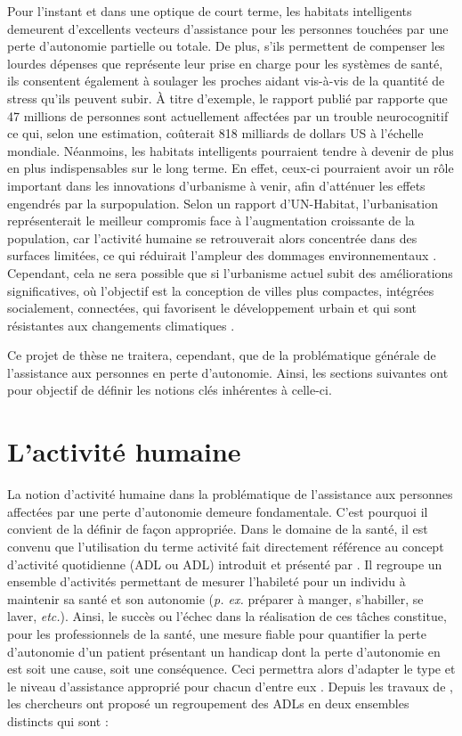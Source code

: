 Pour l’instant et dans une optique de court terme, les habitats intelligents demeurent d’excellents vecteurs d’assistance pour les personnes touchées par une perte d’autonomie partielle ou totale. De plus, s'ils permettent de compenser les lourdes dépenses que représente leur prise en charge pour les systèmes de santé, ils consentent également à soulager les proches aidant vis-à-vis de la quantité de stress qu’ils peuvent subir. À titre d'exemple, le rapport publié par \cite{Prince2016} rapporte que 47 millions de personnes sont actuellement affectées par un trouble neurocognitif ce qui, selon une estimation, coûterait 818 milliards de dollars US à l'échelle mondiale. Néanmoins, les habitats intelligents pourraient tendre à devenir de plus en plus indispensables sur le long terme. En effet, ceux-ci pourraient avoir un rôle important dans les innovations d’urbanisme à venir, afin d’atténuer les effets engendrés par la surpopulation. Selon un rapport d’UN-Habitat, l’urbanisation représenterait le meilleur compromis face à l’augmentation croissante de la population, car l’activité humaine se retrouverait alors concentrée dans des surfaces limitées, ce qui réduirait l’ampleur des dommages environnementaux \citep{UNFPA2007}. Cependant, cela ne sera possible que si l’urbanisme actuel subit des améliorations significatives, où l’objectif est la conception de villes plus compactes, intégrées socialement, connectées, qui favorisent le développement urbain et qui sont résistantes aux changements climatiques \citep{UNFPA2007}. 

Ce projet de thèse ne traitera, cependant, que de la problématique générale de l'assistance aux personnes en perte d'autonomie. Ainsi, les sections suivantes ont pour objectif de définir les notions clés inhérentes à celle-ci.

\section{L'activité humaine}

La notion d'activité humaine dans la problématique de l'assistance aux personnes affectées par une perte d'autonomie demeure fondamentale. C'est pourquoi il convient de la définir de façon appropriée. Dans le domaine de la santé, il est convenu que l'utilisation du terme activité fait directement référence au concept d'activité quotidienne (\acl{ADL} ou \acs{ADL}) introduit et présenté par \cite{Katz1963}. Il regroupe un ensemble d'activités permettant de mesurer l'habileté pour un individu à maintenir sa santé et son autonomie (\textit{p. ex.} préparer à manger, s'habiller, se laver, \textit{etc.}). Ainsi, le succès ou l'échec dans la réalisation de ces tâches constitue, pour les professionnels de la santé, une mesure fiable pour quantifier la perte d'autonomie d'un patient présentant un handicap dont la perte d'autonomie en est soit une cause, soit une conséquence. Ceci permettra alors d'adapter le type et le niveau d'assistance approprié pour chacun d'entre eux \citep{Giovannetti2002}. Depuis les travaux de \cite{Katz1963}, les chercheurs \cite{Lawton1969} ont proposé un regroupement des \acs{ADL}s en deux ensembles distincts qui sont : 

